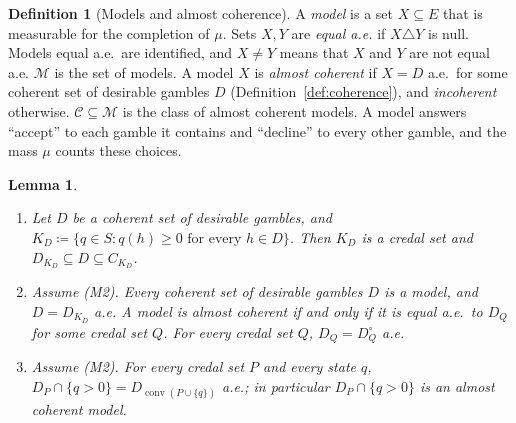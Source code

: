 \documentclass[11pt]{article}
\newtheorem{lemma}[theorem]{Lemma}
\theoremstyle{definition}
\newtheorem{definition}[theorem]{Definition}
\newcommand{\M}{\mathcal M}
\newcommand{\C}{\mathcal C}
\DeclareMathOperator{\conv}{conv}
\begin{document}
\begin{definition}[Models and almost coherence]\label{def:models}
A \emph{model} is a set $X\subseteq E$ that is measurable for the completion of $\mu$. Sets $X,Y$ are \emph{equal a.e.} if $X\triangle Y$ is null. Models equal a.e.\ are identified, and $X\ne Y$ means that $X$ and $Y$ are not equal a.e. $\M$ is the set of models. A model $X$ is \emph{almost coherent} if $X=D$ a.e.\ for some coherent set of desirable gambles $D$ (Definition~\ref{def:coherence}), and \emph{incoherent} otherwise. $\C\subseteq\M$ is the class of almost coherent models. {\color{red}A model answers ``accept'' to each gamble it contains and ``decline'' to every other gamble, and the mass $\mu$ counts these choices.}
\end{definition}

\begin{lemma}\label{lem:identify}
\begin{enumerate}[label=(\alph*)]
\item Let $D$ be a coherent set of desirable gambles, and $K_D\coloneqq\{q\in S:q(h)\ge0\text{ for every }h\in D\}$. Then $K_D$ is a credal set and $D_{K_D}\subseteq D\subseteq C_{K_D}$.
\item Assume (M2). Every coherent set of desirable gambles $D$ is a model, and $D=D_{K_D}$ a.e. A model is almost coherent if and only if it is equal a.e.\ to $D_Q$ for some credal set $Q$. For every credal set $Q$, $D_Q=D^\circ_Q$ a.e.
\item Assume (M2). For every credal set $P$ and every state $q$, $D_P\cap\{q>0\}=D_{\conv(P\cup\{q\})}$ a.e.; in particular $D_P\cap\{q>0\}$ is an almost coherent model.
\end{enumerate}
\end{lemma}
\end{document}
